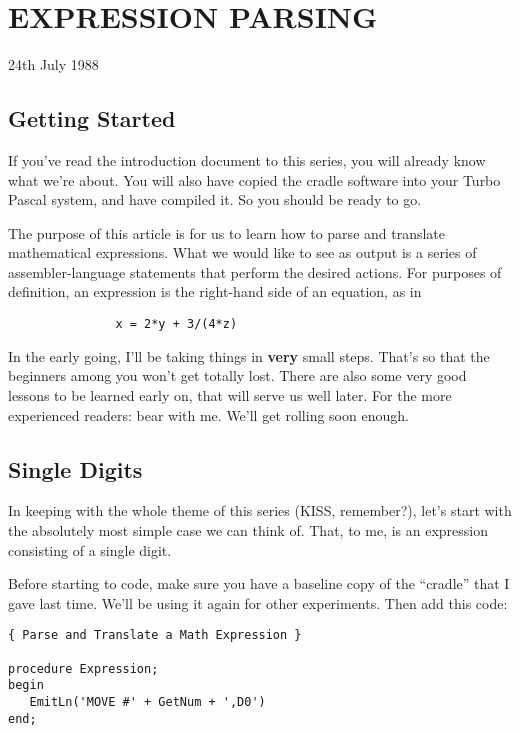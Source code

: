 
\chapter{EXPRESSION PARSING}

24th July 1988

\section{Getting Started}

If you've read the introduction document to this series, you will already know what  we're  about. You will also have copied the cradle software  into your Turbo Pascal system, and have compiled it. So you should be ready to go.

The purpose of this article is for us to learn  how  to parse and translate mathematical expressions. What we would like to see as output is a series of assembler-language statements  that perform the desired actions. For purposes of definition, an expression is the right-hand side of an equation, as in

\begin{verbatim}
               x = 2*y + 3/(4*z)
\end{verbatim}

In the early going, I'll be taking things in {\bfseries very}  small steps. That's  so  that  the beginners among you won't get totally lost. There are also  some  very  good  lessons to be learned early on, that will serve us well later. For the more experienced readers: bear with me. We'll get rolling soon enough.

\section{Single Digits}

In keeping with the whole theme of this series (KISS, remember?), let's start with the absolutely most simple case we can think of. That, to me, is an expression consisting of a single digit.

Before starting to code, make sure you have a  baseline  copy  of the  ``cradle'' that I gave last time. We'll be using it again for other experiments. Then add this code:

\begin{verbatim}
{ Parse and Translate a Math Expression }

procedure Expression;
begin
   EmitLn('MOVE #' + GetNum + ',D0')
end;
\end{verbatim}

